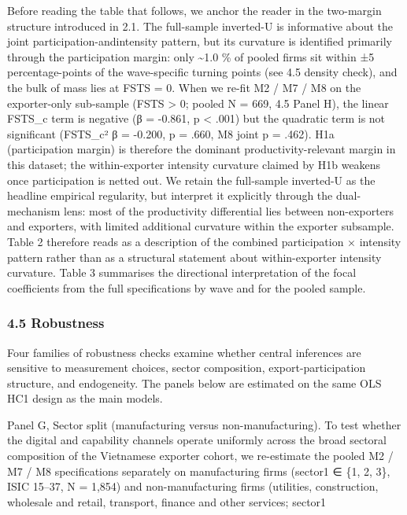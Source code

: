 \documentclass[12pt,a4paper]{article}
\begin{document}
Before reading the table that follows, we anchor the reader in the
two-margin structure introduced in 2.1. The full-sample inverted-U is
informative about the joint participation-andintensity pattern, but its
curvature is identified primarily through the participation margin: only
\textasciitilde1.0 \% of pooled firms sit within ±5 percentage-points of
the wave-specific turning points (see 4.5 density check), and the bulk
of mass lies at FSTS = 0. When we re-fit M2 / M7 / M8 on the
exporter-only sub-sample (FSTS \textgreater{} 0; pooled N = 669, 4.5
Panel H), the linear FSTS\_c term is negative (β = -0.861, p \textless{}
.001) but the quadratic term is not significant (FSTS\_c² β = -0.200, p
= .660, M8 joint p = .462). H1a (participation margin) is therefore the
dominant productivity-relevant margin in this dataset; the
within-exporter intensity curvature claimed by H1b weakens once
participation is netted out. We retain the full-sample inverted-U as the
headline empirical regularity, but interpret it explicitly through the
dual-mechanism lens: most of the productivity differential lies between
non-exporters and exporters, with limited additional curvature within
the exporter subsample. Table 2 therefore reads as a description of the
combined participation × intensity pattern rather than as a structural
statement about within-exporter intensity curvature. Table 3 summarises
the directional interpretation of the focal coefficients from the full
specifications by wave and for the pooled sample.

\hypertarget{45-robustness}{%
\subsubsection{4.5 Robustness}\label{45-robustness}}

Four families of robustness checks examine whether central inferences
are sensitive to measurement choices, sector composition,
export-participation structure, and endogeneity. The panels below are
estimated on the same OLS HC1 design as the main models.

Panel G, Sector split (manufacturing versus non-manufacturing). To test
whether the digital and capability channels operate uniformly across the
broad sectoral composition of the Vietnamese exporter cohort, we
re-estimate the pooled M2 / M7 / M8 specifications separately on
manufacturing firms (sector1 ∈ \{1, 2, 3\}, ISIC 15--37, N = 1,854) and
non-manufacturing firms (utilities, construction, wholesale and retail,
transport, finance and other services; sector1
\end{document}
